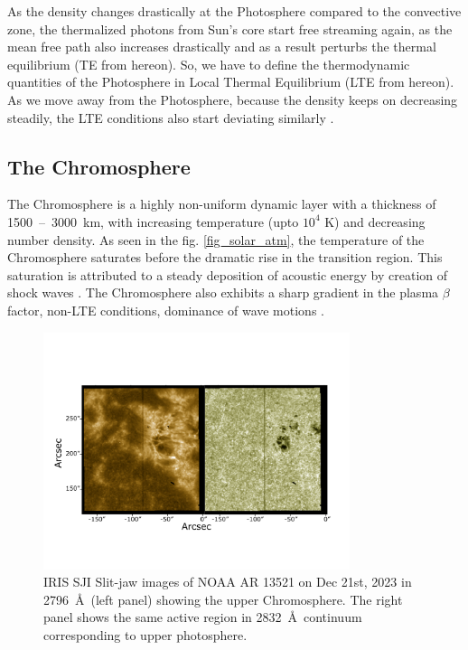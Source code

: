 As the density changes drastically at the Photosphere compared to the convective zone, the thermalized photons from Sun's core start free streaming again, as the mean free path also increases drastically and as a result perturbs the thermal equilibrium (TE from hereon). So, we have to define the thermodynamic quantities of the Photosphere in Local Thermal Equilibrium (LTE from hereon). As we move away from the Photosphere, because the density keeps on decreasing steadily, the LTE conditions also start deviating similarly .

\subsection{The Chromosphere}\label{chromosphere}

The Chromosphere is a highly non-uniform dynamic layer with a thickness of 1500~--~3000~km, with increasing temperature (upto $10^{4}$ K) and decreasing number density. As seen in the fig. \ref{fig_solar_atm}, the temperature of the Chromosphere saturates before the dramatic rise in the transition region. This saturation is attributed to a steady deposition of acoustic energy by creation of shock waves . The Chromosphere also exhibits a sharp gradient in the plasma $\beta$ factor, non-LTE conditions, dominance of wave motions . 

\begin{figure}[ht!]
    \centering
    \includegraphics[trim={1cm 3cm 2cm 5cm},clip,width=0.8\textwidth]{Figures/sji_images.pdf}
    \caption{IRIS SJI Slit-jaw images of NOAA AR 13521 on Dec 21st, 2023 in  2796~\AA~(left panel) showing the upper Chromosphere. The right panel shows the same active region in 2832~\AA~continuum corresponding to upper photosphere.}
    \label{fig:sji_features}
\end{figure}

